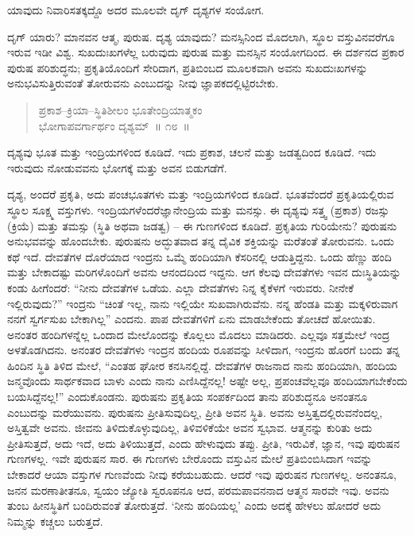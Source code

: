\vspace{-0.3cm}

ಯಾವುದು ನಿವಾರಿಸತಕ್ಕದ್ದೊ ಅದರ ಮೂಲವೇ ದೃಗ್​ ದೃಶ್ಯಗಳ ಸಂಯೋಗ. 

ದೃಗ್​ ಯಾರು? ಮಾನವನ ಆತ್ಮ, ಪುರುಷ. ದೃಶ್ಯ ಯಾವುದು? ಮನಸ್ಸಿನಿಂದ ಮೊದಲಾಗಿ, ಸ್ಥೂಲ ವಸ್ತುವಿನವರೆಗೂ ಇರುವ ಇಡೀ ವಿಶ್ವ. ಸುಖದುಃಖಗಳೆಲ್ಲ ಬರುವುದು ಪುರುಷ ಮತ್ತು ಮನಸ್ಸಿನ ಸಂಯೋಗದಿಂದ. ಈ ದರ್ಶನದ ಪ್ರಕಾರ ಪುರುಷ ಪರಿಶುದ್ಧನು; ಪ್ರಕೃತಿಯೊಂದಿಗೆ ಸೇರಿದಾಗ, ಪ್ರತಿಬಿಂಬದ ಮೂಲಕವಾಗಿ ಅವನು ಸುಖದುಃಖಗಳನ್ನು ಅನುಭವಿಸುತ್ತಿರುವಂತೆ ತೋರುವನು ಎಂಬುದನ್ನು ನೀವು ಜ್ಞಾಪಕದಲ್ಲಿಟ್ಟಿರಬೇಕು. 

\vspace{-0.3cm}

\begin{verse}
ಪ್ರಕಾಶ–ಕ್ರಿಯಾ–ಸ್ಥಿತಿಶೀಲಂ ಭೂತೇಂದ್ರಿಯಾತ್ಮಕಂ\\ ಭೋಗಾಪವರ್ಗಾರ್ಥಂ ದೃಶ್ಯಮ್​~॥ ೧೮~॥
\end{verse}

\vspace{-0.3cm}

ದೃಶ್ಯವು ಭೂತ ಮತ್ತು ಇಂದ್ರಿಯಗಳಿಂದ ಕೂಡಿದೆ. ಇದು ಪ್ರಕಾಶ, ಚಲನೆ ಮತ್ತು ಜಡತ್ವದಿಂದ ಕೂಡಿದೆ. ಇದು ಇರುವುದು ನೋಡುವವನು ಭೋಗಕ್ಕೆ ಮತ್ತು ಅವನ ಬಿಡು\break ಗಡೆಗೆ. 

ದೃಶ್ಯ, ಅಂದರೆ ಪ್ರಕೃತಿ, ಅದು ಪಂಚಭೂತಗಳು ಮತ್ತು ಇಂದ್ರಿಯಗಳಿಂದ ಕೂಡಿದೆ. ಭೂತವೆಂದರೆ ಪ್ರಕೃತಿಯಲ್ಲಿರುವ ಸ್ಥೂಲ ಸೂಕ್ಷ್ಮ ವಸ್ತುಗಳು. ಇಂದ್ರಿಯಗಳೆಂದರೆ\break ಜ್ಞಾನೇಂದ್ರಿಯ ಮತ್ತು ಮನಸ್ಸು. ಈ ದೃಶ್ಯವು ಸತ್ತ್ವ (ಪ್ರಕಾಶ) ರಜಸ್ಸು (ಕ್ರಿಯೆ) ಮತ್ತು ತಮಸ್ಸು (ಸ್ಥಿತಿ ಅಥವಾ ಜಡತ್ವ) – ಈ ಗುಣಗಳಿಂದ ಕೂಡಿದೆ. ಪ್ರಕೃತಿಯ ಗುರಿಯೇನು? ಪುರುಷನು ಅನುಭವವನ್ನು ಹೊಂದಬೇಕು. ಪುರುಷನು ಅದ್ಭುತವಾದ ತನ್ನ ದೈವಿಕ ಶಕ್ತಿಯನ್ನು ಮರೆತಂತೆ ತೋರುವನು. ಒಂದು ಕಥೆ ಇದೆ. ದೇವತೆಗಳ ದೊರೆಯಾದ ಇಂದ್ರನು ಒಮ್ಮೆ ಹಂದಿಯಾಗಿ ಕೆಸರಿನಲ್ಲಿ ಆಡುತ್ತಿದ್ದನು. ಒಂದು ಹೆಣ್ಣು ಹಂದಿ ಮತ್ತು ಬೇಕಾದಷ್ಟು ಮರಿಗಳೊಂದಿಗೆ ಅವನು ಆನಂದದಿಂದ ಇದ್ದನು. ಆಗ ಕೆಲವು ದೇವತೆಗಳು ಇವನ ದುಃಸ್ಥಿತಿಯನ್ನು ಕಂಡು ಹೀಗೆಂದರೆ: “ನೀನು ದೇವತೆಗಳ ಒಡೆಯ. ಎಲ್ಲಾ ದೇವತೆಗಳು ನಿನ್ನ ಕೈಕೆಳಗೆ ಇರುವರು. ನೀನೇಕೆ ಇಲ್ಲಿರುವುದು?” ಇಂದ್ರನು “ಚಿಂತೆ ಇಲ್ಲ, ನಾನು ಇಲ್ಲಿಯೇ ಸುಖ\break ವಾಗಿರುವೆನು. ನನ್ನ ಹೆಂಡತಿ ಮತ್ತು ಮಕ್ಕಳಿರುವಾಗ ನನಗೆ ಸ್ವರ್ಗಸುಖ ಬೇಕಾಗಿಲ್ಲ” ಎಂದನು. ಪಾಪ ದೇವತೆಗಳಿಗೆ ಏನು ಮಾಡಬೇಕೆಂದು ತೋಚದೆ ಹೋಯಿತು. ಅನಂತರ ಹಂದಿಗಳನ್ನೆಲ್ಲ ಒಂದಾದ ಮೇಲೊಂದನ್ನು ಕೊಲ್ಲಲು ಮೊದಲು ಮಾಡಿದರು. ಎಲ್ಲವೂ ಸತ್ತಮೇಲೆ ಇಂದ್ರ ಅಳತೊಡಗಿದನು. ಅನಂತರ ದೇವತೆಗಳು ಇಂದ್ರನ ಹಂದಿಯ ರೂಪವನ್ನು ಸೀಳಿದಾಗ, ಇಂದ್ರನು ಹೊರಗೆ ಬಂದು ತನ್ನ ಹಿಂದಿನ ಸ್ಥಿತಿ ತಿಳಿದ ಮೇಲೆ, “ಎಂತಹ ಘೋರ ಕನಸಿನಲ್ಲಿದ್ದೆ. ದೇವತೆಗಳ ರಾಜನಾದ ನಾನು ಹಂದಿಯಾಗಿ, ಹಂದಿಯ ಜನ್ಮವೊಂದು ಸಾರ್ಥಕವಾದ ಬಾಳು ಎಂದು ನಾನು ಎಣಿಸಿದ್ದೆನಲ್ಲ! ಅಷ್ಟೇ ಅಲ್ಲ, ಪ್ರಪಂಚವೆಲ್ಲವೂ ಹಂದಿಯಾಗಬೇಕೆಂದು ಬಯಸಿದ್ದೆನಲ್ಲ!” ಎಂದುಕೊಂಡನು. ಪುರುಷನು ಪ್ರಕೃತಿಯ ಸಂಪರ್ಕದಿಂದ ತಾನು ಪರಿಶುದ್ಧನೂ ಅನಂತನೂ ಎಂಬುದನ್ನು ಮರೆಯುವನು. ಪುರುಷನು ಪ್ರೀತಿಸುವುದಿಲ್ಲ, ಪ್ರೀತಿ ಅವನ ಸ್ಥಿತಿ. ಅವನು ಅಸ್ತಿತ್ವದಲ್ಲಿರುವನೆಂದಲ್ಲ, ಅಸ್ತಿತ್ವವೇ ಅವನು. ಜೀವನು ತಿಳಿದುಕೊಳ್ಳುವುದಿಲ್ಲ, ತಿಳಿವಳಿಕೆಯೇ ಅವನ ಸ್ವಭಾವ. ಆತ್ಮನನ್ನು ಕುರಿತು ಅದು ಪ್ರೀತಿಸುತ್ತದೆ, ಅದು ಇದೆ, ಅದು ತಿಳಿಯುತ್ತದೆ, ಎಂದು ಹೇಳುವುದು ತಪ್ಪು. ಪ್ರೀತಿ, ಇರುವಿಕೆ, ಜ್ಞಾನ, ಇವು ಪುರುಷನ ಗುಣಗಳಲ್ಲ. ಇವೇ ಪುರುಷನ ಸಾರ. ಈ ಗುಣಗಳು ಬೇರೊಂದು ವಸ್ತುವಿನ ಮೇಲೆ ಪ್ರತಿಬಿಂಬಿಸಿದಾಗ ಇವನ್ನು ಬೇಕಾದರೆ ಆಯಾ ವಸ್ತುಗಳ ಗುಣವೆಂದು ನೀವು ಕರೆಯಬಹುದು. ಆದರೆ ಇವು ಪುರುಷನ ಗುಣಗಳಲ್ಲ. ಅನಂತನೂ, ಜನನ ಮರಣಾತೀತನೂ, ಸ್ವಯಂ ಜ್ಯೋತಿ ಸ್ವರೂಪನೂ ಆದ, ಪರಮಪಾವನನಾದ ಆತ್ಮನ ಸಾರವೇ ಇವು. ಅವನು ತುಂಬ ಹೀನಸ್ಥಿತಿಗೆ ಬಂದಿರುವಂತೆ ತೋರುತ್ತದೆ. ‘ನೀನು ಹಂದಿಯಲ್ಲ’ ಎಂದು ಅದಕ್ಕೆ ಹೇಳಲು ಹೋದರೆ ಅದು ನಿಮ್ಮನ್ನು ಕಚ್ಚಲು ಬರುತ್ತದೆ. 

